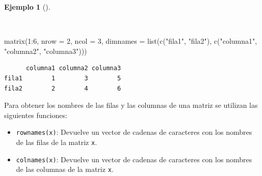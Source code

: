 \documentclass[
  a4paper,
]{scrreport}
\newenvironment{Shaded}{\begin{snugshade}}{\end{snugshade}}
\newcommand{\AttributeTok}[1]{\textcolor[rgb]{0.40,0.45,0.13}{#1}}
\newcommand{\DecValTok}[1]{\textcolor[rgb]{0.68,0.00,0.00}{#1}}
\newcommand{\FunctionTok}[1]{\textcolor[rgb]{0.28,0.35,0.67}{#1}}
\newcommand{\NormalTok}[1]{\textcolor[rgb]{0.00,0.23,0.31}{#1}}
\newcommand{\SpecialCharTok}[1]{\textcolor[rgb]{0.37,0.37,0.37}{#1}}
\newcommand{\StringTok}[1]{\textcolor[rgb]{0.13,0.47,0.30}{#1}}
\providecommand{\tightlist}{%
  \setlength{\itemsep}{0pt}\setlength{\parskip}{0pt}}\usepackage{longtable,booktabs,array}
\theoremstyle{definition}
\theoremstyle{definition}
\newtheorem{example}{Ejemplo}[chapter]
\theoremstyle{remark}
\begin{document}
\begin{example}[]\protect\hypertarget{exm-creacion-matrices-con-nombres}{}\label{exm-creacion-matrices-con-nombres}

~

\begin{Shaded}
\begin{Highlighting}[]
\FunctionTok{matrix}\NormalTok{(}\DecValTok{1}\SpecialCharTok{:}\DecValTok{6}\NormalTok{, }\AttributeTok{nrow =} \DecValTok{2}\NormalTok{, }\AttributeTok{ncol =} \DecValTok{3}\NormalTok{, }\AttributeTok{dimnames =} \FunctionTok{list}\NormalTok{(}\FunctionTok{c}\NormalTok{(}\StringTok{"fila1"}\NormalTok{, }\StringTok{"fila2"}\NormalTok{), }\FunctionTok{c}\NormalTok{(}\StringTok{"columna1"}\NormalTok{, }\StringTok{"columna2"}\NormalTok{, }\StringTok{"columna3"}\NormalTok{)))}
\end{Highlighting}
\end{Shaded}

\begin{verbatim}
      columna1 columna2 columna3
fila1        1        3        5
fila2        2        4        6
\end{verbatim}

\end{example}

Para obtener los nombres de las filas y las columnas de una matriz se
utilizan las siguientes funciones:

\begin{itemize}
\tightlist
\item
  \texttt{rownames(x)}: Devuelve un vector de cadenas de caracteres con
  los nombres de las filas de la matriz \texttt{x}.
\item
  \texttt{colnames(x)}: Devuelve un vector de cadenas de caracteres con
  los nombres de las columnas de la matriz \texttt{x}.
\end{itemize}
\end{document}
